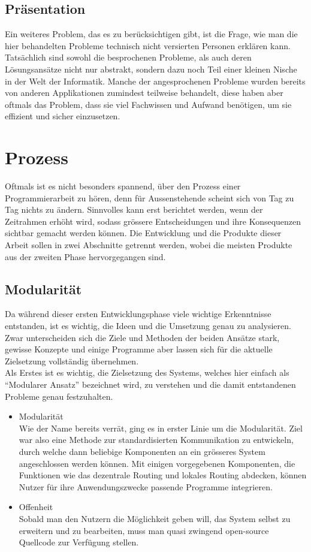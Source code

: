 \documentclass[a4paper,11pt,titlepage,twoside]{memoir}
\begin{document}
\section{Präsentation}
\label{sec:orgf205b5f}
Ein weiteres Problem, das es zu berücksichtigen gibt, ist die Frage,
wie man die hier behandelten Probleme technisch nicht versierten
Personen erklären kann. Tatsächlich sind sowohl die besprochenen
Probleme, als auch deren Lösungsansätze nicht nur abstrakt, sondern
dazu noch Teil einer kleinen Nische in der Welt der Informatik. Manche
der angesprochenen Probleme wurden bereits von anderen Applikationen
zumindest teilweise behandelt, diese haben aber oftmals das Problem,
dass sie viel Fachwissen und Aufwand benötigen, um sie effizient und
sicher einzusetzen.
\chapter{Prozess}
\label{sec:orga2a87eb}
Oftmals ist es nicht besonders spannend, über den Prozess einer
Programmierarbeit zu hören, denn für Aussenstehende scheint sich von
Tag zu Tag nichts zu ändern. Sinnvolles kann erst berichtet werden,
wenn der Zeitrahmen erhöht wird, sodass grössere Entscheidungen und
ihre Konsequenzen sichtbar gemacht werden können. Die Entwicklung und
die Produkte dieser Arbeit sollen in zwei Abschnitte getrennt werden,
wobei die meisten Produkte aus der zweiten Phase hervorgegangen sind.
\section{Modularität}
\label{sec:org579e038}
Da während dieser ersten Entwicklungsphase viele wichtige Erkenntnisse
entstanden, ist es wichtig, die Ideen und die Umsetzung genau zu
analysieren. Zwar unterscheiden sich die Ziele und Methoden der beiden
Ansätze stark, gewisse Konzepte und einige Programme aber lassen sich
für die aktuelle Zielsetzung vollständig übernehmen.\\

\noindent Als Erstes ist es wichtig, die Zielsetzung des Systems,
welches hier einfach als “Modularer Ansatz” bezeichnet wird, zu
verstehen und die damit entstandenen Probleme genau festzuhalten.
\begin{itemize}
\item Modularität \\
Wie der Name bereits verrät, ging es in erster Linie um die
Modularität. Ziel war also eine Methode zur standardisierten
Kommunikation zu entwickeln, durch welche dann beliebige Komponenten
an ein grösseres System angeschlossen werden können. Mit einigen
vorgegebenen Komponenten, die Funktionen wie das dezentrale Routing
und lokales Routing abdecken, können Nutzer für ihre
Anwendungszwecke passende Programme integrieren.
\item Offenheit \\
Sobald man den Nutzern die Möglichkeit geben will, das System selbst
zu erweitern und zu bearbeiten, muss man quasi zwingend open-source
Quellcode zur Verfügung stellen.
\end{itemize}
\end{document}
